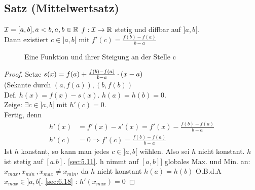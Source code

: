 	\subsection{Satz (Mittelwertsatz)}\label{sec:6.19}
	$\mathcal{I} = [a,b], a < b , a,b \in \mathbb{R}$\marginpar{Speziell: $f(a) =f(b) \Rightarrow \exists c \in ]a,b[$ mit $f'(c) = 0$ Satz von Rolle} $\\
	f: \mathcal{I} \to \mathbb{R}$ stetig und diffbar auf $]a,b[$.\\
	Dann existiert $c \in ]a,b[$ mit $f'(c) = \frac{f(b)-f(a)}{b-a}$
	\begin{figure}[h!]
		\centering
		\caption{Eine Funktion und ihrer Steigung an der Stelle c}
	\end{figure}
	\begin{proof}
		Setze $s(x) = f(a) + \frac{f(b) -f(a)}{b-a} \cdot (x-a)$\\
		(Sekante durch $(a,f(a)),(b,f(b))$\\
		Def. $h(x) = f(x) - s(x)$. $h(a) = h(b) = 0$.\\
		Zeige: $\exists c \in ]a,b[ $ mit $h'(c) = 0$.\\
		Fertig, denn 
		\begin{align*}
			h'(x) &=f'(x) - s'(x)
			= f'(x) - \frac{f(b)-f(a)}{b-a}\\
			h'(c) &= 0 \Rightarrow f'(c) = \frac{f(b)-f(a)}{b-a} 
		\end{align*}
		Ist $h$ konstant, so kann man jedes $c \in ]a,b[$ wählen. Also sei $h$ nicht konstant. $h$ ist stetig auf $[a.b]$. \ref{sec:5.11}. h nimmt auf $[a,b]]$ globales Max. und Min. an: $x_{max}, x_{min}\, , x_{max} \ne x_{min}$, da $h$ nicht konstant $h(a) = h(b)$ O.B.d.A\\
		$x_{max} \in ]a,b[.$ \ref{sec:6.18} : $h'(x_{max}) = 0$
	\end{proof}
